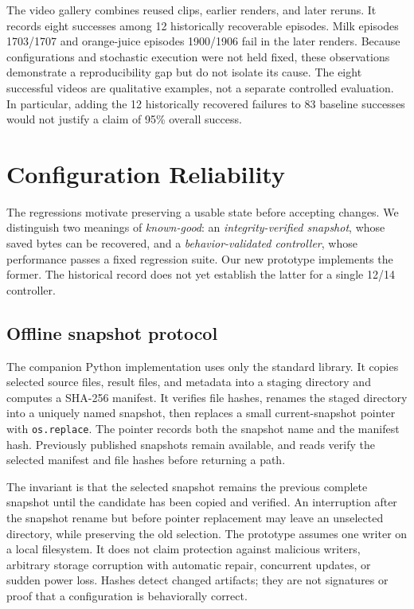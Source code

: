 \documentclass[10pt,twocolumn]{article}
\begin{document}
The video gallery combines reused clips, earlier renders, and later reruns. It records eight successes among 12 historically recoverable episodes. Milk episodes 1703/1707 and orange-juice episodes 1900/1906 fail in the later renders. Because configurations and stochastic execution were not held fixed, these observations demonstrate a reproducibility gap but do not isolate its cause. The eight successful videos are qualitative examples, not a separate controlled evaluation. In particular, adding the 12 historically recovered failures to 83 baseline successes would not justify a claim of 95\% overall success.

\section{Configuration Reliability}
The regressions motivate preserving a usable state before accepting changes. We distinguish two meanings of \emph{known-good}: an \emph{integrity-verified snapshot}, whose saved bytes can be recovered, and a \emph{behavior-validated controller}, whose performance passes a fixed regression suite. Our new prototype implements the former. The historical record does not yet establish the latter for a single 12/14 controller.

\subsection{Offline snapshot protocol}
The companion Python implementation uses only the standard library. It copies selected source files, result files, and metadata into a staging directory and computes a SHA-256 manifest. It verifies file hashes, renames the staged directory into a uniquely named snapshot, then replaces a small current-snapshot pointer with \texttt{os.replace}. The pointer records both the snapshot name and the manifest hash. Previously published snapshots remain available, and reads verify the selected manifest and file hashes before returning a path.

The invariant is that the selected snapshot remains the previous complete snapshot until the candidate has been copied and verified. An interruption after the snapshot rename but before pointer replacement may leave an unselected directory, while preserving the old selection. The prototype assumes one writer on a local filesystem. It does not claim protection against malicious writers, arbitrary storage corruption with automatic repair, concurrent updates, or sudden power loss. Hashes detect changed artifacts; they are not signatures or proof that a configuration is behaviorally correct.
\end{document}
